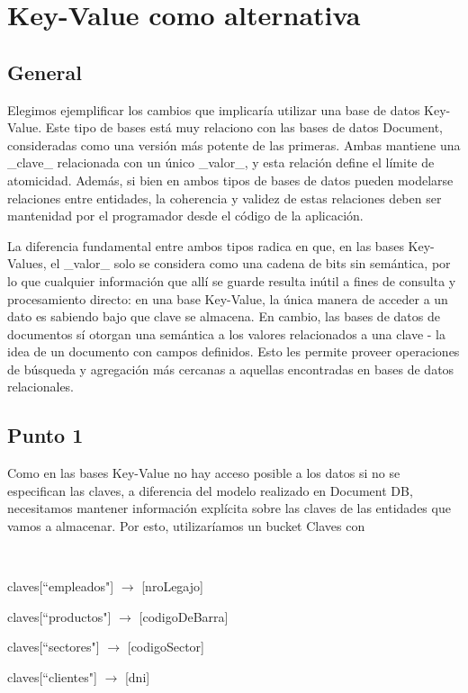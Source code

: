 \section{Key-Value como alternativa}

\subsection{General}
Elegimos ejemplificar los cambios que implicaría utilizar una base de datos Key-Value.
Este tipo de bases está muy relaciono con las bases de datos Document, consideradas como una versión más potente de las primeras.
Ambas mantiene una _clave_ relacionada con un único _valor_, y esta relación define el límite de atomicidad. Además,
si bien en ambos tipos de bases de datos pueden modelarse relaciones entre entidades, la coherencia y validez de estas relaciones
deben ser mantenidad por el programador desde el código de la aplicación.

La diferencia fundamental entre ambos tipos radica en que, en las bases Key-Values, el _valor_ solo se considera como una cadena de bits
sin semántica, por lo que cualquier información que allí se guarde resulta inútil a fines de consulta y procesamiento directo: en una
base Key-Value, la única manera de acceder a un dato es sabiendo bajo que clave se almacena. En cambio, las bases de datos de documentos sí otorgan
una semántica a los valores relacionados a una clave - la idea de un documento con campos definidos. Esto les permite proveer operaciones
de búsqueda y agregación más cercanas a aquellas encontradas en bases de datos relacionales.

\subsection{Punto 1}
Como en las bases Key-Value no hay acceso posible a los datos si no se
especifican las claves, a diferencia del modelo realizado en Document DB, necesitamos mantener
información explícita sobre las claves de las entidades que vamos a almacenar. Por esto, utilizaríamos un bucket Claves con

~

  claves[``empleados"] $\rightarrow$ {[nroLegajo]}

  claves[``productos"] $\rightarrow$ {[codigoDeBarra]}

  claves[``sectores"]  $\rightarrow$ {[codigoSector]}

  claves[``clientes"]  $\rightarrow$ {[dni]}

